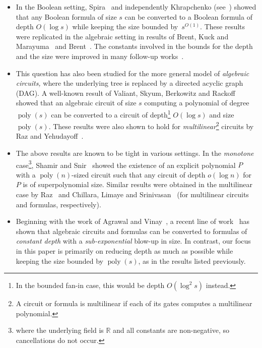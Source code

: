 \documentclass[11pt,a4paper]{article}
\newcommand{\poly}{\mathop{\mathrm{poly}}}
\begin{document}
\begin{itemize}
\item In the Boolean setting, Spira~\cite{Spira71tradeoffs} and independently Khrapchenko (see~\cite{YK68}) showed that any Boolean formula of size $s$ can be converted to a Boolean formula of depth $O(\log s)$ while keeping the size bounded by~$s^{O(1)}.$ These results were replicated in the algebraic setting in results of Brent, Kuck and Marayuma~\cite{BKM} and Brent~\cite{Brent}. The constants involved in the bounds for the depth and the size were improved in many follow-up works~\cite{PreparataMuller1, PreparataMuller2, Kos86, BCE, BonetBuss}.


\item This question has also been studied for the more general model of \emph{algebraic circuits,} where the underlying tree is replaced by a directed acyclic graph (DAG). A well-known result of Valiant, Skyum, Berkowitz and Rackoff~\cite{VSBR} showed that an algebraic circuit of size $s$ computing a polynomial of degree $\poly(s)$ can be converted to a circuit of depth\footnote{In the bounded fan-in case, this would be depth $O(\log^2 s)$ instead.} $O(\log s)$ and size $\poly(s)$. These results were also shown to hold for \emph{multilinear}\footnote{A circuit or formula is multilinear if each of its gates computes a multilinear polynomial.} circuits by Raz and Yehudayoff~\cite{RYbalance}.

\item The above results are known to be tight in various settings. In the \emph{monotone} case\footnote{where the underlying field is $\mathbb{R}$ and all constants are non-negative, so cancellations do not occur.}, Shamir and Snir~\cite{ShamirSnir} showed the existence of an explicit polynomial $P$ with a $\poly(n)$-sized circuit such that any circuit of depth $o(\log n)$ for $P$ is of superpolynomial size. Similar results were obtained in the multilinear case by  Raz~\cite{Raznc2nc1} and Chillara, Limaye and Srinivasan~\cite{CLS} (for multilinear circuits and formulas, respectively).

\item Beginning with the work of Agrawal and Vinay~\cite{AV}, a recent line of work~\cite{Koiran, Tav13, GKKSdepth3, KSS, CKSV, KOS19} has shown that algebraic circuits and formulas can be converted to formulas of \emph{constant depth} with a \emph{sub-exponential} blow-up in size. In contrast, our focus in this paper is primarily on reducing depth as much as possible while keeping the size bounded by $\poly(s)$, as in the results listed previously.
\end{itemize}
\end{document}
